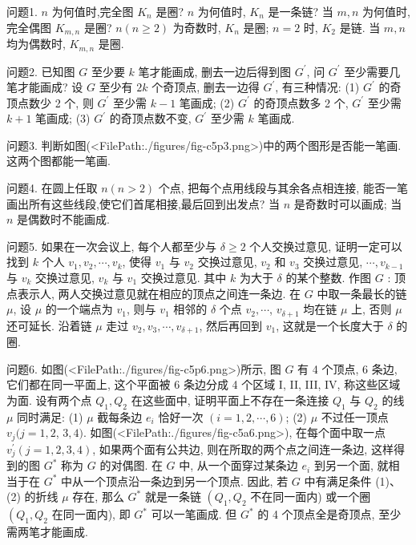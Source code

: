 
问题1. $n$ 为何值时,完全图 $K_n$ 是圈? $n$ 为何值时, $K_n$ 是一条链? 当 $m, n$ 为何值时,完全偶图 $K_{m, n}$ 是圈?
$n(n \geqslant 2)$ 为奇数时, $K_n$ 是圈; $n=2$ 时, $K_2$ 是链.
当 $m, n$ 均为偶数时, $K_{m, n}$ 是圈.



问题2. 已知图 $G$ 至少要 $k$ 笔才能画成, 删去一边后得到图 $G^{\prime}$, 问 $G^{\prime}$ 至少需要几笔才能画成?
设 $G$ 至少有 $2 k$ 个奇顶点, 删去一边得 $G^{\prime}$, 有三种情况: (1) $G^{\prime}$ 的奇顶点数少 2 个, 则 $G^{\prime}$ 至少需 $k-1$ 笔画成; (2) $G^{\prime}$ 的奇顶点数多 2 个, $G^{\prime}$ 至少需 $k+1$ 笔画成; (3) $G^{\prime}$ 的奇顶点数不变, $G^{\prime}$ 至少需 $k$ 笔画成.



问题3. 判断如图(<FilePath:./figures/fig-c5p3.png>)中的两个图形是否能一笔画.
这两个图都能一笔画.



问题4. 在圆上任取 $n(n>2)$ 个点, 把每个点用线段与其余各点相连接, 能否一笔画出所有这些线段,使它们首尾相接,最后回到出发点?
当 $n$ 是奇数时可以画成; 当 $n$ 是偶数时不能画成.



问题5. 如果在一次会议上, 每个人都至少与 $\delta \geqslant 2$ 个人交换过意见, 证明一定可以找到 $k$ 个人 $v_1, v_2, \cdots, v_k$, 使得 $v_1$ 与 $v_2$ 交换过意见, $v_2$ 和 $v_3$ 交换过意见, $\cdots, v_{k-1}$ 与 $v_k$ 交换过意见, $v_k$ 与 $v_1$ 交换过意见.
其中 $k$ 为大于 $\delta$ 的某个整数.
作图 $G$ : 顶点表示人, 两人交换过意见就在相应的顶点之间连一条边.
在 $G$ 中取一条最长的链 $\mu$, 设 $\mu$ 的一个端点为 $v_1$, 则与 $v_1$ 相邻的 $\delta$ 个点 $v_2, \cdots$, $v_{\delta+1}$ 均在链 $\mu$ 上, 否则 $\mu$ 还可延长.
沿着链 $\mu$ 走过 $v_2, v_3, \cdots, v_{\delta+1}$, 然后再回到 $v_1$, 这就是一个长度大于 $\delta$ 的圈.



问题6. 如图(<FilePath:./figures/fig-c5p6.png>)所示, 图 $G$ 有 4 个顶点, 6 条边, 它们都在同一平面上, 这个平面被 6 条边分成 4 个区域 I, II, III, IV, 称这些区域为面.
设有两个点 $Q_1, Q_2$ 在这些面中, 证明平面上不存在一条连接 $Q_1$ 与 $Q_2$ 的线 $\mu$ 同时满足: (1) $\mu$ 截每条边 $e_i$ 恰好一次 $(i=1,2, \cdots, 6)$; (2) $\mu$ 不过任一顶点 $v_j(j=1,2$, $3,4)$.
如图(<FilePath:./figures/fig-c5a6.png>), 在每个面中取一点 $v_j^{\prime}(j=1,2,3,4)$, 如果两个面有公共边, 则在所取的两个点之间连一条边, 这样得到的图 $G^*$ 称为 $G$ 的对偶图.
在 $G$ 中, 从一个面穿过某条边 $e_i$ 到另一个面, 就相当于在 $G^*$ 中从一个顶点沿一条边到另一个顶点.
因此, 若 $G$ 中有满足条件 (1)、(2) 的折线 $\mu$ 存在, 那么 $G^*$ 就是一条链 $\left(Q_1, Q_2\right.$ 不在同一面内) 或一个圈 $\left(Q_1, Q_2\right.$ 在同一面内), 即 $G^*$ 可以一笔画成.
但 $G^*$ 的 4 个顶点全是奇顶点, 至少需两笔才能画成.



